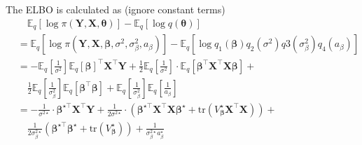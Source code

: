 \documentclass[12pt]{article}
\begin{document}
The ELBO is calculated as (ignore constant terms)
\begin{align*}
	&\quad \mathbb{E}_q[\log \pi (\bm{Y}, \bm{X}, \bm{\theta})] - \mathbb{E}_q[\log q(\bm{\theta})]\\
	&=\mathbb{E}_q[\log \pi (\bm{Y}, \bm{X}, \bm{\beta}, \sigma^2, \sigma_{\beta}^2, a_{\beta})] - \mathbb{E}_q[\log q_1(\bm{\beta})q_2(\sigma^2)q3(\sigma_{\beta}^2)q_4(a_{\beta})]\\
	&=-\mathbb{E}_q\left[\frac{1}{\sigma^2} \right]\mathbb{E}_q[\bm{\beta}]^\top \bm{X}^\top \bm{Y} + \frac{1}{2}\mathbb{E}_q\left[\frac{1}{\sigma^2} \right]\cdot \mathbb{E}_q[\bm{\beta}^\top \bm{X}^\top \bm{X}\bm{\beta}]+\\
	&\quad \frac{1}{2} \mathbb{E}_q\left[\frac{1}{\sigma_\beta^2}\right]\mathbb{E}_q[\bm{\beta}^\top \bm{\beta}] + \mathbb{E}_q\left[\frac{1}{\sigma_\beta^2}\right] \mathbb{E}_q\left[\frac{1}{a_\beta}\right]\\
	&=-\frac{1}{\sigma^{2\star}}\cdot \bm{\beta}^{\star \top} \bm{X}^{\top} \bm{Y} + \frac{1}{2\sigma^{2\star}}\cdot \left( \bm{\beta}^{\star\top} \bm{X}^{\top}\bm{X} \bm{\beta}^{\star}  + \text{tr}(V_{\bm{\beta}}^\star\bm{X}^\top \bm{X})\right) +\\
	&\quad \frac{1}{2\sigma_{\beta}^{2\star}}\left(\bm{\beta}^{\star\top} \bm{\beta}^{\star} + \text{tr}(V_{\bm{\beta}}^\star) \right) + \frac{1}{\sigma_{\beta}^{2\star} a_{\beta}^\star}
\end{align*}



\end{document}
